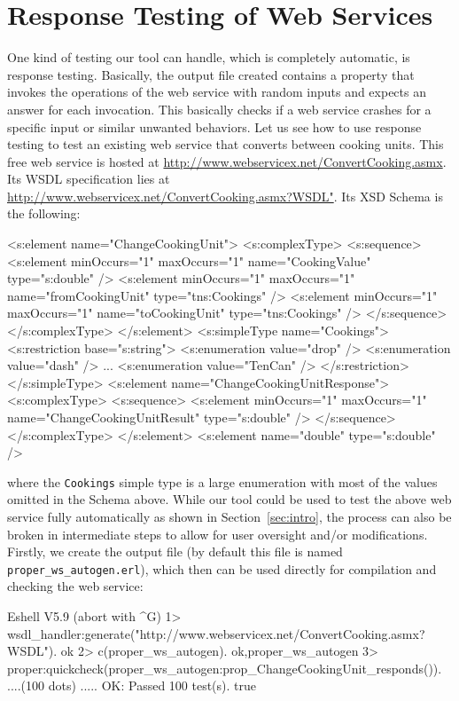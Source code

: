 \documentclass[submission,copyright]{eptcs}
\begin{document}
\section{Response Testing of Web Services} \label{sec:response_testing}

One kind of testing our tool can handle, which is completely
automatic, is response testing. Basically, the output file created
contains a property that invokes the operations of the web service
with random inputs and expects an answer for each invocation. This
basically checks if a web service crashes for a specific input or
similar unwanted behaviors.
%
Let us see how to use response testing to test an existing web service
that converts between cooking units. This free web service is hosted
at \url{http://www.webservicex.net/ConvertCooking.asmx}. Its WSDL
specification lies at
\url{http://www.webservicex.net/ConvertCooking.asmx?WSDL"}.
Its XSD Schema is the following:
\begin{lstxsd}
  <s:element name="ChangeCookingUnit">
    <s:complexType>
      <s:sequence>
        <s:element minOccurs="1" maxOccurs="1" name="CookingValue" type="s:double" />
        <s:element minOccurs="1" maxOccurs="1" name="fromCookingUnit" type="tns:Cookings" />
        <s:element minOccurs="1" maxOccurs="1" name="toCookingUnit" type="tns:Cookings" />
      </s:sequence>
    </s:complexType>
  </s:element>
  <s:simpleType name="Cookings">
    <s:restriction base="s:string">
      <s:enumeration value="drop" />
      <s:enumeration value="dash" />
      ...
      <s:enumeration value="TenCan" />
    </s:restriction>
  </s:simpleType>
  <s:element name="ChangeCookingUnitResponse">
    <s:complexType>
      <s:sequence>
        <s:element minOccurs="1" maxOccurs="1" name="ChangeCookingUnitResult" type="s:double" />
      </s:sequence>
    </s:complexType>
  </s:element>
  <s:element name="double" type="s:double" />
\end{lstxsd}
where the \texttt{Cookings} simple type is a large enumeration with
most of the values omitted in the Schema above. While our tool could
be used to test the above web service fully automatically as shown in
Section~\ref{sec:intro}, the process can also be broken in
intermediate steps to allow for user oversight and/or modifications.
Firstly, we create the output file (by default this file is named
\texttt{proper\_ws\_autogen.erl}), which then can be used directly for
compilation and checking the web service:

\begin{lstoutput}
Eshell V5.9  (abort with ^G)
1> wsdl_handler:generate("http://www.webservicex.net/ConvertCooking.asmx?WSDL").
ok
2> c(proper_ws_autogen).
{ok,proper_ws_autogen}
3> proper:quickcheck(proper_ws_autogen:prop_ChangeCookingUnit_responds()).
....(100 dots) .....
OK: Passed 100 test(s).
true
\end{lstoutput}
\end{document}
